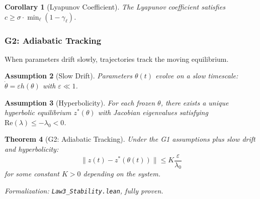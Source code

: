 \documentclass[12pt]{article}
\newtheorem{theorem}{Theorem}[section]
\newtheorem{corollary}[theorem]{Corollary}
\newtheorem{assumption}[theorem]{Assumption}
\begin{document}
\begin{corollary}[Lyapunov Coefficient]
\label{cor:lyap-coeff}
The Lyapunov coefficient satisfies $c \geq \sigma \cdot \min_\ell (1 - \gamma_\ell)$.
\end{corollary}

\subsubsection{G2: Adiabatic Tracking}

When parameters drift slowly, trajectories track the moving equilibrium.

\begin{assumption}[Slow Drift]
Parameters $\theta(t)$ evolve on a slow timescale: $\dot{\theta} = \varepsilon h(\theta)$ with $\varepsilon \ll 1$.
\end{assumption}

\begin{assumption}[Hyperbolicity]
For each frozen $\theta$, there exists a unique hyperbolic equilibrium $z^*(\theta)$ with Jacobian eigenvalues satisfying $\text{Re}(\lambda) \leq -\lambda_0 < 0$.
\end{assumption}

\begin{theorem}[G2: Adiabatic Tracking]
\label{thm:g2}
Under the G1 assumptions plus slow drift and hyperbolicity:
\[
\|z(t) - z^*(\theta(t))\| \leq K \frac{\varepsilon}{\lambda_0}
\]
for some constant $K > 0$ depending on the system.
\end{theorem}
\noindent\textit{Formalization: \texttt{Law3\_Stability.lean}, fully proven.}
\end{document}
